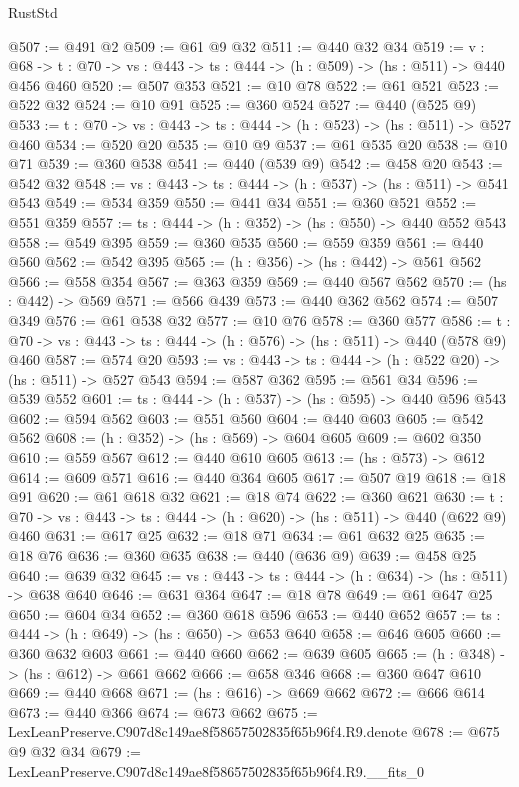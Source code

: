 \begin{lexlean}{RustStd}
\begin{coremodule}
@507 := @491 @2
@509 := @61 @9 @32
@511 := @440 @32 @34
@519 := {v : @68} ->
  {t : @70} -> {vs : @443} -> {ts : @444} -> (h : @509) -> (hs : @511) -> @440 @456 @460
@520 := @507 @353
@521 := @10 @78
@522 := @61 @521
@523 := @522 @32
@524 := @10 @91
@525 := @360 @524
@527 := @440 (@525 @9)
@533 := {t : @70} -> {vs : @443} -> {ts : @444} -> (h : @523) -> (hs : @511) -> @527 @460
@534 := @520 @20
@535 := @10 @9
@537 := @61 @535 @20
@538 := @10 @71
@539 := @360 @538
@541 := @440 (@539 @9)
@542 := @458 @20
@543 := @542 @32
@548 := {vs : @443} -> {ts : @444} -> (h : @537) -> (hs : @511) -> @541 @543
@549 := @534 @359
@550 := @441 @34
@551 := @360 @521
@552 := @551 @359
@557 := {ts : @444} -> (h : @352) -> (hs : @550) -> @440 @552 @543
@558 := @549 @395
@559 := @360 @535
@560 := @559 @359
@561 := @440 @560
@562 := @542 @395
@565 := (h : @356) -> (hs : @442) -> @561 @562
@566 := @558 @354
@567 := @363 @359
@569 := @440 @567 @562
@570 := (hs : @442) -> @569
@571 := @566 @439
@573 := @440 @362 @562
@574 := @507 @349
@576 := @61 @538 @32
@577 := @10 @76
@578 := @360 @577
@586 := {t : @70} -> {vs : @443} -> {ts : @444} -> (h : @576) -> (hs : @511) -> @440 (@578 @9) @460
@587 := @574 @20
@593 := {vs : @443} -> {ts : @444} -> (h : @522 @20) -> (hs : @511) -> @527 @543
@594 := @587 @362
@595 := @561 @34
@596 := @539 @552
@601 := {ts : @444} -> (h : @537) -> (hs : @595) -> @440 @596 @543
@602 := @594 @562
@603 := @551 @560
@604 := @440 @603
@605 := @542 @562
@608 := (h : @352) -> (hs : @569) -> @604 @605
@609 := @602 @350
@610 := @559 @567
@612 := @440 @610 @605
@613 := (hs : @573) -> @612
@614 := @609 @571
@616 := @440 @364 @605
@617 := @507 @19
@618 := @18 @91
@620 := @61 @618 @32
@621 := @18 @74
@622 := @360 @621
@630 := {t : @70} -> {vs : @443} -> {ts : @444} -> (h : @620) -> (hs : @511) -> @440 (@622 @9) @460
@631 := @617 @25
@632 := @18 @71
@634 := @61 @632 @25
@635 := @18 @76
@636 := @360 @635
@638 := @440 (@636 @9)
@639 := @458 @25
@640 := @639 @32
@645 := {vs : @443} -> {ts : @444} -> (h : @634) -> (hs : @511) -> @638 @640
@646 := @631 @364
@647 := @18 @78
@649 := @61 @647 @25
@650 := @604 @34
@652 := @360 @618 @596
@653 := @440 @652
@657 := {ts : @444} -> (h : @649) -> (hs : @650) -> @653 @640
@658 := @646 @605
@660 := @360 @632 @603
@661 := @440 @660
@662 := @639 @605
@665 := (h : @348) -> (hs : @612) -> @661 @662
@666 := @658 @346
@668 := @360 @647 @610
@669 := @440 @668
@671 := (hs : @616) -> @669 @662
@672 := @666 @614
@673 := @440 @366
@674 := @673 @662
@675 := LexLeanPreserve.C907d8c149ae8f58657502835f65b96f4.R9.denote
@678 := @675 @9 @32 @34
@679 := LexLeanPreserve.C907d8c149ae8f58657502835f65b96f4.R9.__fits_0

\end{coremodule}
\end{lexlean}
